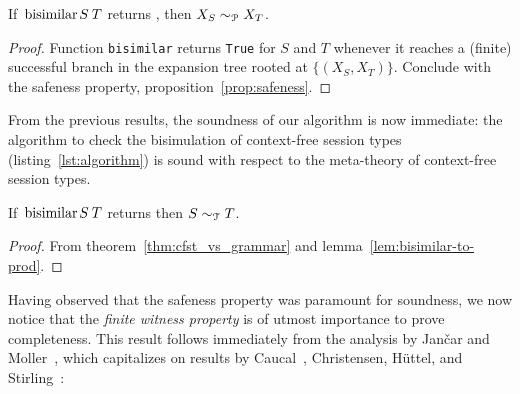 
\begin{lemma}
  \label{lem:bisimilar-to-prod}
  If $\bisimf S T$ returns , then
  $X_{S} \sim_\mathcal P X_{T}$.
\end{lemma}

\begin{proof}
  Function \lstinline|bisimilar| returns \lstinline|True| for $S$ and
  $T$ whenever it reaches a (finite) successful branch in the expansion
  tree rooted at $\{(X_{S}, X_{T})\}$. Conclude with the safeness property,
  proposition~\ref{prop:safeness}.
\end{proof}

From the previous results, the soundness of our algorithm is now
immediate: the algorithm to check the bisimulation of context-free
session types (listing~\ref{lst:algorithm}) is sound with respect to
the meta-theory of context-free session types.

\begin{theorem}
  If $\bisimf ST$ returns  then $S\sim_\mathcal T T$.
\end{theorem}

\begin{proof}
  From theorem~\ref{thm:cfst_vs_grammar} and
  lemma~\ref{lem:bisimilar-to-prod}.
\end{proof}

Having observed that the safeness property was paramount for
soundness, we now notice that the \emph{finite witness property} is of
utmost importance to prove completeness. This result follows
immediately from the analysis by Jan{\v{c}}ar and
Moller~\cite{janvcar1999techniques}, which capitalizes on results by
Caucal~\cite{caucal1986decidabilite}, Christensen, H{\"{u}}ttel, and
Stirling~\cite{DBLP:journals/iandc/ChristensenHS95}:

